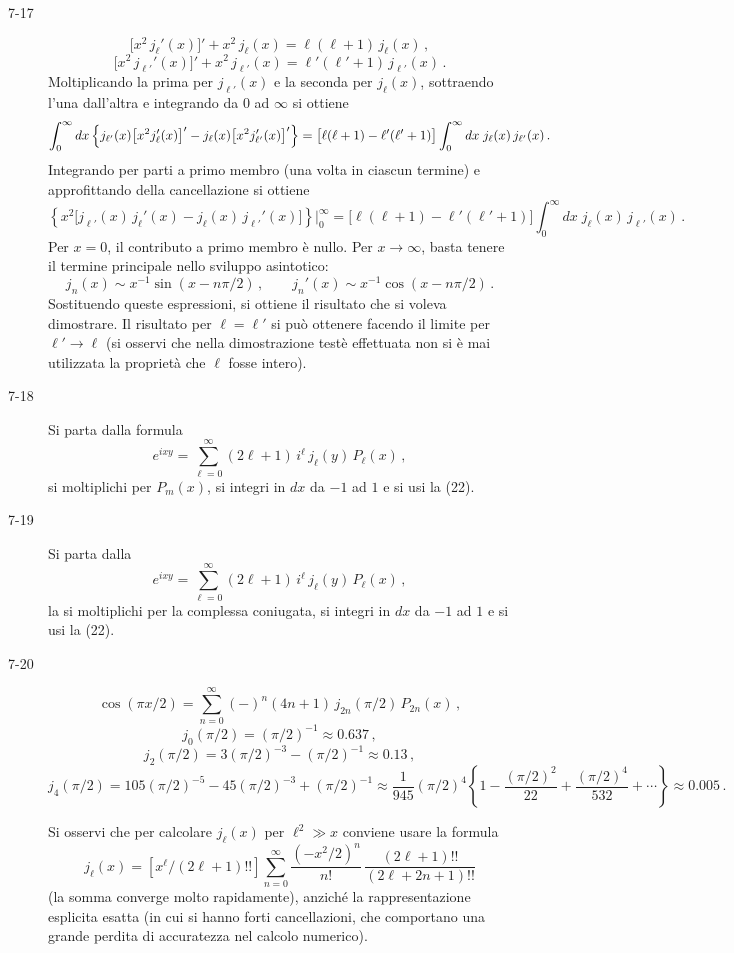 \documentclass[11pt, a4paper]{book}
\numberwithin{equation}{section}
\begin{document}
\begin{description}
\item[7-17]
\[
  \bigl[x^2\,j_\ell'(x)\bigr]' + x^2\,j_\ell(x) = \ell(\ell+1)\,j_\ell(x)\,,
\]
\[
  \bigl[x^2\,j_{\ell'}'(x)\bigr]' + x^2\,j_{\ell'}(x) = \ell'(\ell'+1)\,j_{\ell'}(x)\,.
\]
Moltiplicando la prima per $j_{\ell'}(x)$ e la seconda per $j_\ell(x)$, sottraendo l'una dall'altra e integrando da $0$ ad $\infty$ si ottiene
\[
  \int_0^\infty dx\,\Bigl\{j_{\ell'}(x)\bigl[x^2 j_\ell'(x)\bigr]' - j_\ell(x)\bigl[x^2 j_{\ell'}'(x)\bigr]'\Bigr\}
  = \bigl[\ell(\ell+1)-\ell'(\ell'+1)\bigr]\int_0^\infty dx\;j_\ell(x)\,j_{\ell'}(x)\,.
\]
Integrando per parti a primo membro (una volta in ciascun termine) e approfittando della cancellazione si ottiene
\[
  \left\{x^2\bigl[j_{\ell'}(x)\,j_\ell'(x) - j_\ell(x)\,j_{\ell'}'(x)\bigr]\right\}\bigg|_0^\infty
  = \bigl[\ell(\ell+1)-\ell'(\ell'+1)\bigr]\int_0^\infty dx\;j_\ell(x)\,j_{\ell'}(x)\,.
\]
Per $x=0$, il contributo a primo membro è nullo. Per $x\to\infty$, basta tenere il termine principale nello sviluppo asintotico:
\[
  j_n(x) \sim x^{-1}\sin(x - n\pi/2)\,,\qquad
  j_n'(x) \sim x^{-1}\cos(x - n\pi/2)\,.
\]
Sostituendo queste espressioni, si ottiene il risultato che si voleva dimostrare. Il risultato per $\ell=\ell'$ si può ottenere facendo il limite per $\ell'\to\ell$ (si osservi che nella dimostrazione testè effettuata non si è mai utilizzata la proprietà che $\ell$ fosse intero).

\item[7-18] Si parta dalla formula
\[
  e^{ixy} = \sum_{\ell=0}^{\infty}(2\ell+1)\,i^\ell\,j_\ell(y)\,P_\ell(x)\,,
\]
si moltiplichi per $P_m(x)$, si integri in $dx$ da $-1$ ad $1$ e si usi la (22).

\item[7-19] Si parta dalla
\[
  e^{ixy} = \sum_{\ell=0}^{\infty}(2\ell+1)\,i^\ell\,j_\ell(y)\,P_\ell(x)\,,
\]
la si moltiplichi per la complessa coniugata, si integri in $dx$ da $-1$ ad $1$ e si usi la (22).

\item[7-20]
\[
  \cos(\pi x/2) = \sum_{n=0}^{\infty}(-)^n(4n+1)\,j_{2n}(\pi/2)\,P_{2n}(x)\,,
\]
\[
  j_0(\pi/2) = (\pi/2)^{-1} \approx 0.637\,,
\]
\[
  j_2(\pi/2) = 3(\pi/2)^{-3} - (\pi/2)^{-1} \approx 0.13\,,
\]
\[
  j_4(\pi/2) = 105(\pi/2)^{-5} - 45(\pi/2)^{-3} + (\pi/2)^{-1}
  \approx \frac{1}{945}(\pi/2)^4\left\{1 - \frac{(\pi/2)^2}{22} + \frac{(\pi/2)^4}{532} + \cdots\right\}
  \approx 0.005\,.
\]

Si osservi che per calcolare $j_\ell(x)$ per $\ell^2 \gg x$ conviene usare la formula
\[
  j_\ell(x) = \left[x^\ell/(2\ell+1)!!\right]
  \sum_{n=0}^{\infty} \frac{(-x^2/2)^n}{n!}\,\frac{(2\ell+1)!!}{(2\ell+2n+1)!!}
\]
(la somma converge molto rapidamente), anziché la rappresentazione esplicita esatta (in cui si hanno forti cancellazioni, che comportano una grande perdita di accuratezza nel calcolo numerico).


\end{description}
\end{document}
